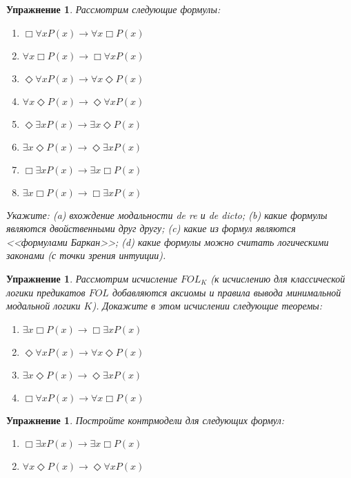 \documentclass[11pt]{article}
\newtheorem{exercise}[theorem]{Упражнение}
\begin{document}
\begin{exercise} Рассмотрим следующие формулы:
\begin{multicols}{2}
\begin{enumerate}
\item $ \Box \forall x P(x) \to \forall x \Box P(x)$ 
\item $ \forall x \Box P(x) \to \Box \forall x P(x)$ 
\item $ \Diamond \forall x P(x) \to \forall x \Diamond P(x)$ 
\item $ \forall x \Diamond P(x) \to \Diamond  \forall x P(x)$ 
\item $ \Diamond \exists x P(x) \to \exists x \Diamond P(x)$	
\item $ \exists x \Diamond P(x) \to \Diamond \exists x P(x)$
\item $ \Box \exists x P(x) \to \exists x \Box P(x)$	
\item $ \exists x \Box P(x) \to  \Box \exists x P(x)$ 	
\end{enumerate}
\end{multicols}

Укажите: (a) вхождение модальности de re и de dicto; (b) какие формулы являются двойственными друг другу; (c) какие из формул являются <<формулами Баркан>>; (d) какие формулы можно считать логическими законами (с точки зрения интуиции).
\end{exercise}

\begin{exercise} Рассмотрим исчисление $FOL_{K}$ (к исчислению для классической логики предикатов $FOL$ добавляются аксиомы и правила вывода минимальной модальной логики $K$). Докажите в этом исчислении следующие теоремы:
\begin{multicols}{2}
\begin{enumerate}
    \item $\exists x \Box P(x) \to \Box \exists x P(x)$
    \item $\Diamond \forall x  P(x) \to \forall x \Diamond P(x)$
    \item $\exists x \Diamond P(x) \to \Diamond  \exists x P(x)$
    \item $\Box \forall x  P(x) \to \forall x \Box P(x)$
\end{enumerate}
\end{multicols}
\end{exercise}

\begin{exercise} Постройте контрмодели  для следующих формул:
\begin{multicols}{2}
\begin{enumerate}
    \item $ \Box \exists x P(x) \to \exists x \Box P(x)$
    \item $ \forall x \Diamond P(x) \to \Diamond \forall x  P(x)$
\end{enumerate}
\end{multicols}
\end{exercise}
\end{document}
